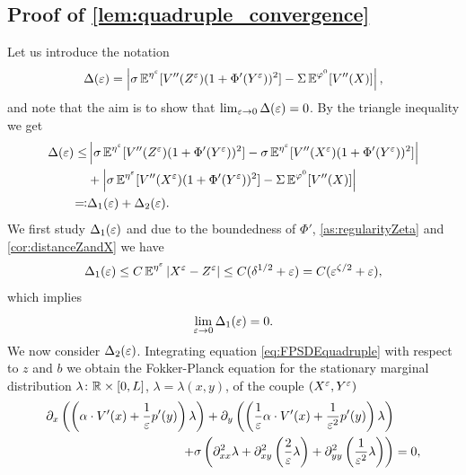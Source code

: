 \documentclass[review,onefignum,onetabnum]{siamonline190516}
\begin{document}
\begin{appendices}
\subsection{Proof of \cref{lem:quadruple_convergence}}

	Let us introduce the notation 
	\begin{equation}
	\Delta(\varepsilon) = \left| \sigma \operatorname{\mathbb{E}}^{\eta^\varepsilon} [V''(Z^\varepsilon) (1 + \Phi'(Y^\varepsilon))^2] - \Sigma \operatorname{\mathbb{E}}^{\varphi^0} [V''(X)] \right|,
	\end{equation}
	and note that the aim is to show that $\lim_{\varepsilon \to 0} \Delta(\varepsilon) = 0$. By the triangle inequality we get
	\begin{equation}
	\begin{aligned}
	\Delta(\varepsilon) \le& \left| \sigma \operatorname{\mathbb{E}}^{\eta^\varepsilon} [V''(Z^\varepsilon) (1 + \Phi'(Y^\varepsilon))^2] - \sigma \operatorname{\mathbb{E}}^{\eta^\varepsilon} [V''(X^\varepsilon) (1 + \Phi'(Y^\varepsilon))^2] \right| \\
	&+ \left| \sigma \operatorname{\mathbb{E}}^{\eta^\varepsilon} [V''(X^\varepsilon) (1 + \Phi'(Y^\varepsilon))^2] - \Sigma \operatorname{\mathbb{E}}^{\varphi^0} [V''(X)] \right| \\
	\eqqcolon& \Delta_1(\varepsilon) + \Delta_2(\varepsilon).
	\end{aligned}
	\end{equation}
	We first study $\Delta_1(\varepsilon)$ and due to the boundedness of $\Phi'$, \cref{as:regularityZeta} and \cref{cor:distanceZandX} we have
	\begin{equation}
	\Delta_1(\varepsilon) \le C \operatorname{\mathbb{E}}^{\eta^\varepsilon} \left\lvert X^\varepsilon - Z^\varepsilon\right\rvert \le C (\delta^{1/2} + \varepsilon) = C (\varepsilon^{\zeta/2} + \varepsilon),
	\end{equation}
	which implies
	\begin{equation}
	\lim_{\varepsilon \to 0} \Delta_1(\varepsilon) = 0.
	\end{equation}
	We now consider $\Delta_2(\varepsilon)$. Integrating equation \eqref{eq:FPSDEquadruple} with respect to $z$ and $b$ we obtain the Fokker-Planck equation for the stationary marginal distribution $\lambda \colon \mathbb{R} \times [0,L]$, $\lambda = \lambda(x,y)$, of the couple $(X^\varepsilon,Y^\varepsilon)$
	\begin{equation}
	\begin{aligned}
	\partial_x \left( \left( \alpha \cdot V'(x) + \frac1\epl p'(y) \right) \lambda \right) + \partial_y \left( \left( \frac1\epl \alpha \cdot V'(x) + \frac{1}{\epl^2} p'(y) \right) \lambda \right) & \\
	+ \sigma \left( \partial_{xx}^2 \lambda + \partial_{xy}^2 \left( \frac2\epl \lambda \right) + \partial_{yy}^2 \left( \frac{1}{\epl^2} \lambda \right) \right) &= 0,
	\end{aligned}

\end{equation}
\end{appendices}
\end{document}
